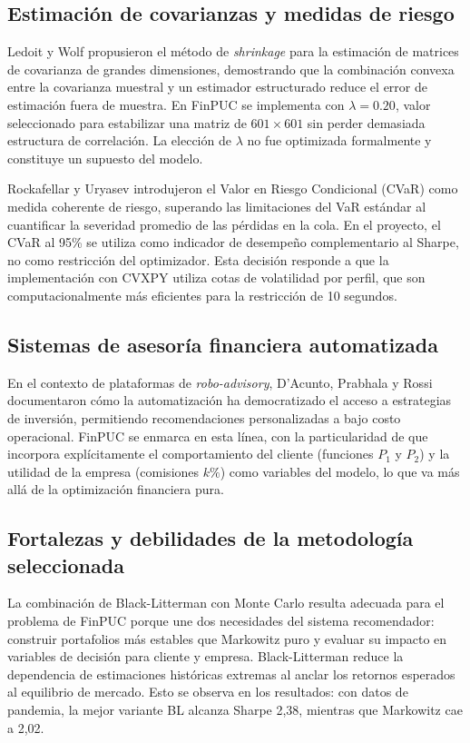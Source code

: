 \subsection{Estimaci\'on de covarianzas y medidas de riesgo}

Ledoit y Wolf \cite{ledoit2004} propusieron el m\'etodo de \textit{shrinkage}
para la estimaci\'on de matrices de covarianza de grandes dimensiones,
demostrando que la combinaci\'on convexa entre la covarianza muestral y un
estimador estructurado reduce el error de estimaci\'on fuera de muestra. En
FinPUC se implementa con $\lambda = 0.20$, valor seleccionado para
estabilizar una matriz de $601 \times 601$ sin perder demasiada estructura de
correlaci\'on. La elecci\'on de $\lambda$ no fue optimizada formalmente y
constituye un supuesto del modelo.

Rockafellar y Uryasev \cite{rockafellar2000} introdujeron el Valor en Riesgo
Condicional (CVaR) como medida coherente de riesgo, superando las limitaciones
del VaR est\'andar al cuantificar la severidad promedio de las p\'erdidas en
la cola. En el proyecto, el CVaR al 95\% se utiliza como indicador de
desempe\~no complementario al Sharpe, no como restricci\'on del optimizador.
Esta decisi\'on responde a que la implementaci\'on con CVXPY utiliza cotas de
volatilidad por perfil, que son computacionalmente m\'as eficientes para la
restricci\'on de 10 segundos.

\subsection{Sistemas de asesor\'ia financiera automatizada}

En el contexto de plataformas de \textit{robo-advisory}, D'Acunto, Prabhala y
Rossi \cite{dacunto2019} documentaron c\'omo la automatizaci\'on ha
democratizado el acceso a estrategias de inversi\'on, permitiendo
recomendaciones personalizadas a bajo costo operacional. FinPUC se enmarca en
esta l\'inea, con la particularidad de que incorpora expl\'icitamente el
comportamiento del cliente (funciones $P_1$ y $P_2$) y la utilidad de la
empresa (comisiones $k\%$) como variables del modelo, lo que va m\'as all\'a
de la optimizaci\'on financiera pura.

\subsection{Fortalezas y debilidades de la metodolog\'ia seleccionada}

La combinaci\'on de Black-Litterman con Monte Carlo resulta adecuada para el problema de FinPUC porque une dos necesidades del sistema recomendador: construir portafolios m\'as estables que Markowitz puro y evaluar su impacto en variables de decisi\'on para cliente y empresa. Black-Litterman reduce la dependencia de estimaciones hist\'oricas extremas al anclar los retornos esperados al equilibrio de mercado. Esto se observa en los resultados: con datos de pandemia, la mejor variante BL alcanza Sharpe 2,38, mientras que Markowitz cae a 2,02.

